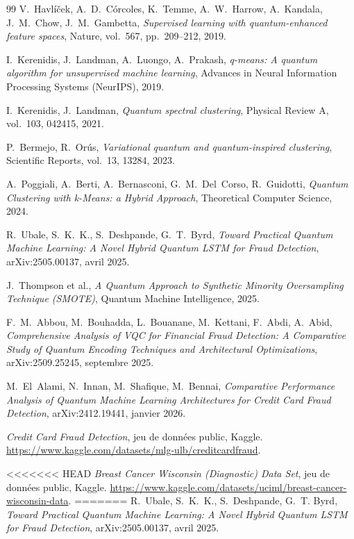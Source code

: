 \documentclass[a4paper]{article}
\begin{document}
\begin{thebibliography}{99}
 V.~Havlíček, A.~D.~Córcoles, K.~Temme, A.~W.~Harrow, A.~Kandala, J.~M.~Chow, J.~M.~Gambetta, \textit{Supervised learning with quantum-enhanced feature spaces}, Nature, vol.~567, pp.~209--212, 2019.

 I.~Kerenidis, J.~Landman, A.~Luongo, A.~Prakash, \textit{q-means: A quantum algorithm for unsupervised machine learning}, Advances in Neural Information Processing Systems (NeurIPS), 2019.

 I.~Kerenidis, J.~Landman, \textit{Quantum spectral clustering}, Physical Review A, vol.~103, 042415, 2021.

 P.~Bermejo, R.~Orús, \textit{Variational quantum and quantum-inspired clustering}, Scientific Reports, vol.~13, 13284, 2023.

 A.~Poggiali, A.~Berti, A.~Bernasconi, G.~M.~Del~Corso, R.~Guidotti, \textit{Quantum Clustering with k-Means: a Hybrid Approach}, Theoretical Computer Science, 2024.


 R.~Ubale, S.~K.~K., S.~Deshpande, G.~T.~Byrd, \textit{Toward Practical Quantum Machine Learning: A Novel Hybrid Quantum LSTM for Fraud Detection}, arXiv:2505.00137, avril 2025.

 J.~Thompson et al., \textit{A Quantum Approach to Synthetic Minority Oversampling Technique (SMOTE)}, Quantum Machine Intelligence, 2025.

 F.~M.~Abbou, M.~Bouhadda, L.~Bouanane, M.~Kettani, F.~Abdi, A.~Abid, \textit{Comprehensive Analysis of VQC for Financial Fraud Detection: A Comparative Study of Quantum Encoding Techniques and Architectural Optimizations}, arXiv:2509.25245, septembre 2025.

 M.~El~Alami, N.~Innan, M.~Shafique, M.~Bennai, \textit{Comparative Performance Analysis of Quantum Machine Learning Architectures for Credit Card Fraud Detection}, arXiv:2412.19441, janvier 2026.


 \textit{Credit Card Fraud Detection}, jeu de données public, Kaggle. \url{https://www.kaggle.com/datasets/mlg-ulb/creditcardfraud}.

<<<<<<< HEAD
 \textit{Breast Cancer Wisconsin (Diagnostic) Data Set}, jeu de données public, Kaggle. \url{https://www.kaggle.com/datasets/uciml/breast-cancer-wisconsin-data}.
=======
 R.~Ubale, S.~K.~K., S.~Deshpande, G.~T. Byrd, \textit{Toward Practical Quantum Machine Learning: A Novel Hybrid Quantum LSTM for Fraud Detection}, arXiv:2505.00137, avril 2025.


\end{thebibliography}
\end{document}
